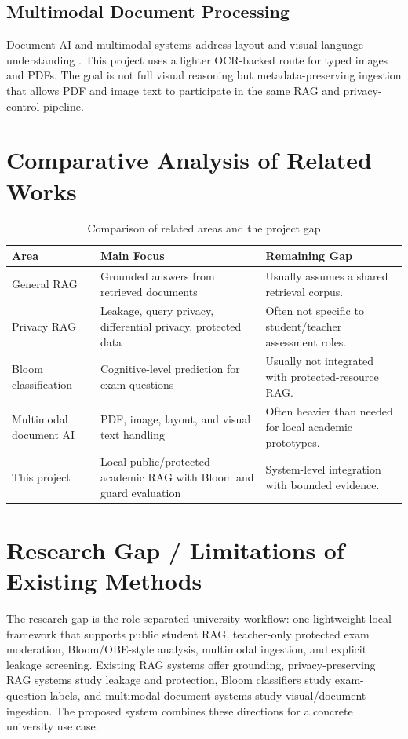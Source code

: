 \subsection{Multimodal Document Processing}
Document AI and multimodal systems address layout and visual-language understanding \cite{huang2022layoutlmv3,liu2023llava}. This project uses a lighter OCR-backed route for typed images and PDFs. The goal is not full visual reasoning but metadata-preserving ingestion that allows PDF and image text to participate in the same RAG and privacy-control pipeline.

\section{Comparative Analysis of Related Works}

\begin{table}[H]
\centering
\caption{Comparison of related areas and the project gap}
\label{tab:related_gap_report}
\begin{tabular}{p{}p{}p{}}
\toprule
\textbf{Area} & \textbf{Main Focus} & \textbf{Remaining Gap} \\
\midrule
General RAG & Grounded answers from retrieved documents & Usually assumes a shared retrieval corpus. \\
Privacy RAG & Leakage, query privacy, differential privacy, protected data & Often not specific to student/teacher assessment roles. \\
Bloom classification & Cognitive-level prediction for exam questions & Usually not integrated with protected-resource RAG. \\
Multimodal document AI & PDF, image, layout, and visual text handling & Often heavier than needed for local academic prototypes. \\
This project & Local public/protected academic RAG with Bloom and guard evaluation & System-level integration with bounded evidence. \\
\bottomrule
\end{tabular}
\end{table}

\section{Research Gap / Limitations of Existing Methods}

The research gap is the role-separated university workflow: one lightweight local framework that supports public student RAG, teacher-only protected exam moderation, Bloom/OBE-style analysis, multimodal ingestion, and explicit leakage screening. Existing RAG systems offer grounding, privacy-preserving RAG systems study leakage and protection, Bloom classifiers study exam-question labels, and multimodal document systems study visual/document ingestion. The proposed system combines these directions for a concrete university use case.

